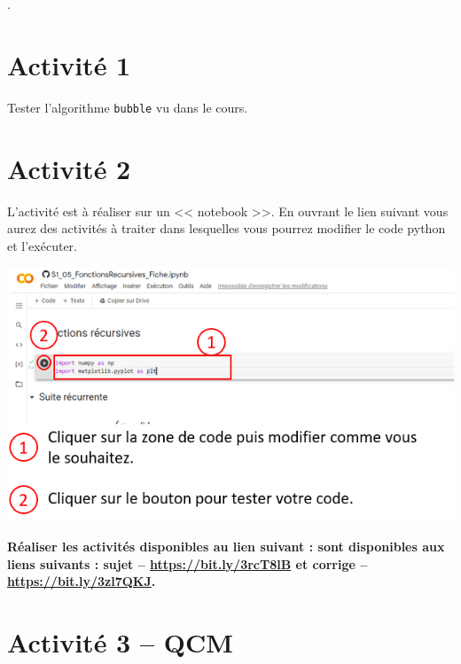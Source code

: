 \documentclass[t,10pt]{article}
\begin{document}
\enteteinfo

\setlength{\columnseprule}{0.4pt}.

\section*{Activité 1}

Tester l'algorithme \texttt{bubble} vu dans le cours. 

\section*{Activité 2}

L'activité est à réaliser sur un  << notebook >>.  En ouvrant le lien suivant vous aurez des activités à traiter dans lesquelles vous pourrez modifier le code python et l'exécuter.

\begin{center}
\includegraphics[width=.6\linewidth]{collab}
\end{center}

\textbf{Réaliser les activités disponibles au lien suivant :  sont disponibles aux liens suivants : sujet -- \url{https://bit.ly/3rcT8lB} et corrige -- \url{https://bit.ly/3zl7QKJ}.}



\section*{Activité 3 -- QCM}

\begin{multicols}{2}

\end{multicols}
\end{document}
